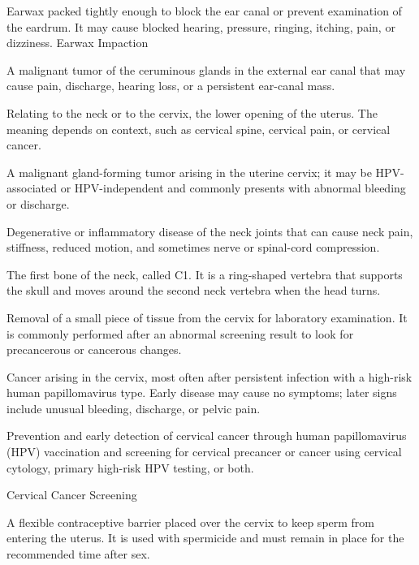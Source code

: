  Earwax packed tightly enough to block the ear canal or prevent examination of the eardrum. It may cause blocked hearing, pressure, ringing, itching, pain, or dizziness.
\synonyms
Earwax Impaction

 A malignant tumor of the ceruminous glands in the external ear canal that may cause pain, discharge, hearing loss, or a persistent ear-canal mass.

 Relating to the neck or to the cervix, the lower opening of the uterus. The meaning depends on context, such as cervical spine, cervical pain, or cervical cancer.

 A malignant gland-forming tumor arising in the uterine cervix; it may be HPV-associated or HPV-independent and commonly presents with abnormal bleeding or discharge.

 Degenerative or inflammatory disease of the neck joints that can cause neck pain, stiffness, reduced motion, and sometimes nerve or spinal-cord compression.

 The first bone of the neck, called C1. It is a ring-shaped vertebra that supports the skull and moves around the second neck vertebra when the head turns.

 Removal of a small piece of tissue from the cervix for laboratory examination. It is commonly performed after an abnormal screening result to look for precancerous or cancerous changes.

 Cancer arising in the cervix, most often after persistent infection with a high-risk human papillomavirus type. Early disease may cause no symptoms; later signs include unusual bleeding, discharge, or pelvic pain.

 Prevention and early detection of cervical cancer through human papillomavirus (HPV) vaccination and screening for cervical precancer or cancer using cervical cytology, primary high-risk HPV testing, or both.


\synonyms
Cervical Cancer Screening

 A flexible contraceptive barrier placed over the cervix to keep sperm from entering the uterus. It is used with spermicide and must remain in place for the recommended time after sex.

